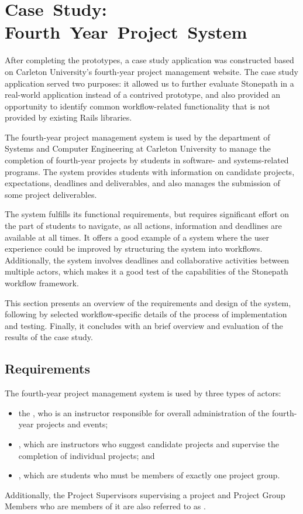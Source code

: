 \documentclass[document.tex]{subfiles}
\begin{document}
\chapter{Case~Study: Fourth~Year~Project~System}
\label {ch:case-study-1}

After completing the prototypes, a case study application was constructed based on Carleton University's fourth-year project management website. The case study application served two purposes: it allowed us to further evaluate Stonepath in a real-world application instead of a contrived prototype, and also provided an opportunity to identify common workflow-related functionality that is not provided by existing Rails libraries.

The fourth-year project management system is used by the department of Systems and Computer Engineering at Carleton University to manage the completion of fourth-year projects by students in software- and systems-related programs. The system provides students with information on candidate projects, expectations, deadlines and deliverables, and also manages the submission of some project deliverables.

The system fulfills its functional requirements, but requires significant effort on the part of students to navigate, as all actions, information and deadlines are available at all times. It offers a good example of a system where the user experience could be improved by structuring the system into workflows. Additionally, the system involves deadlines and collaborative activities between multiple actors, which makes it a good test of the capabilities of the Stonepath workflow framework.

This section presents an overview of the requirements and design of the system, following by selected workflow-specific details of the process of implementation and testing. Finally, it concludes with an brief overview and evaluation of the results of the case study.

\section {Requirements}
\label {sec:4ys-requirements}

The fourth-year project management system is used by three types of actors:
\begin{itemize}
\item the , who is an instructor responsible for overall administration of the fourth-year projects and events;
\item {}, which are instructors who suggest candidate projects and supervise the completion of individual projects; and
\item {}, which are students who must be members of exactly one project group.
\end{itemize}
Additionally, the Project Supervisors supervising a project and Project Group Members who are members of it are also referred to as .
\end{document}

